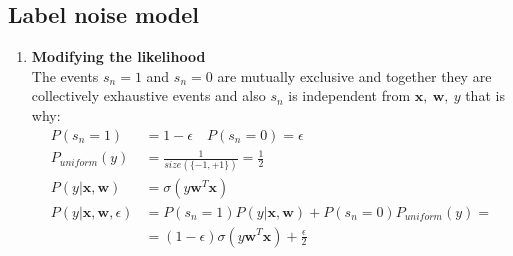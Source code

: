 \documentclass{article}
\newcommand{\vect}[1]{\boldsymbol{#1}} %
\begin{document}
			\subsection{Label noise model}
				\begin{enumerate}[label=(\alph*)]
					\item 
						\textbf{Modifying the likelihood}\\
						The events $s_{n}=1$ and $s_{n}=0$ are mutually exclusive and together they are collectively exhaustive events and also  $s_{n}$ is independent from $\vect{x},\ \vect{w},\ y$ that is why:
						\begin{align*}
							P(s_{n}=1) &= 1 - \epsilon \quad P(s_{n}=0)=\epsilon
							\\
							P_{uniform}(y) &= \frac{1}{size(\{-1, +1\})}=\frac{1}{2}
							\\
							P(y|\vect{x},\vect{w}) &= \sigma(y\vect{w}^{T}\vect{x})
							\\
							P(y|\vect{x}, \vect{w}, \epsilon) &= P(s_{n}=1)P(y|\vect{x},\vect{w}) + P(s_{n}=0)P_{uniform}(y)=
							\\
							&=(1-\epsilon)\sigma(y\vect{w}^{T}\vect{x}) + \frac{\epsilon}{2}
						\end{align*}
						

\end{enumerate}
\end{document}
